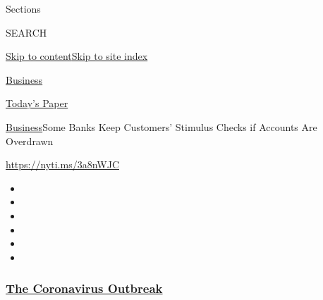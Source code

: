 Sections

SEARCH

\protect\hyperlink{site-content}{Skip to
content}\protect\hyperlink{site-index}{Skip to site index}

\href{https://www.nytimes3xbfgragh.onion/section/business}{Business}

\href{https://myaccount.nytimes3xbfgragh.onion/auth/login?response_type=cookie\&client_id=vi}{}

\href{https://www.nytimes3xbfgragh.onion/section/todayspaper}{Today's
Paper}

\href{/section/business}{Business}\textbar{}Some Banks Keep Customers'
Stimulus Checks if Accounts Are Overdrawn

\url{https://nyti.ms/3a8nWJC}

\begin{itemize}
\item
\item
\item
\item
\item
\item
\end{itemize}

\hypertarget{the-coronavirus-outbreak}{%
\subsubsection{\texorpdfstring{\href{https://www.nytimes3xbfgragh.onion/news-event/coronavirus?name=styln-coronavirus-markets\&region=TOP_BANNER\&block=storyline_menu_recirc\&action=click\&pgtype=Article\&impression_id=dac9d7b0-f2a8-11ea-8f04-735a2495ff97\&variant=undefined}{The
Coronavirus
Outbreak}}{The Coronavirus Outbreak}}\label{the-coronavirus-outbreak}}

